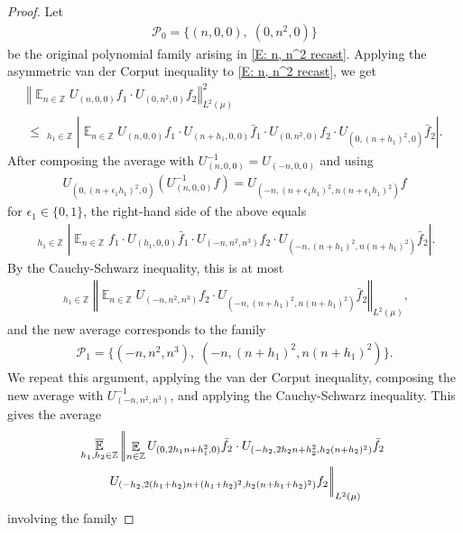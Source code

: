 \documentclass[11pt]{amsart}
\theoremstyle{definition}
\DeclareMathOperator*{\oE}{\overline{\mathbb{E}}}
\DeclareMathOperator*{\E}{\mathbb{E}}
\newcommand{\Z}{{\mathbb Z}}
\newcommand{\CP}{{\mathcal P}}
\newcommand{\eps}{\epsilon}
\newcommand{\norm}[1]{\left\Vert #1\right\Vert}
\newcommand{\inv}{^{-1}}
\newcommand{\1}{{\mathbf{1}}}
\newcommand{\abs}[1]{\mathopen{}\left| #1\mathclose{}\right|}
\begin{document}
\begin{proof}
Let
\begin{align*}
    \CP_0 = \{(n,0,0),\; (0, n^2,0)\}
\end{align*}
be the original polynomial family arising in \eqref{E: n, n^2 recast}. Applying the asymmetric van der Corput inequality to \eqref{E: n, n^2 recast}, we get
\begin{multline*}
    \norm{\E_{n\in\Z} U_{(n,0,0)}f_1\cdot U_{(0,n^2,0)}f_2}_{L^2(\mu)}^2\\
    \leq \oE_{h_1\in\Z}\abs{\E_{n\in \Z}U_{(n,0,0)}f_1\cdot U_{(n+h_1,0,0)}\bar f_1\cdot U_{(0,n^2,0)}f_2\cdot U_{(0,(n+h_1)^2,0)}\bar f_2}.
\end{multline*}
After composing the average with $U_{(n,0,0)}\inv = U_{(-n,0,0)}$ and using
\begin{align*}
    U_{(0,(n+\eps_1 h_1)^2,0)}(U_{(n,0,0)}\inv f) = U_{(-n, (n+\eps_1 h_1)^2, n(n+\eps_1 h_1)^2)}f
\end{align*}
for $\eps_1\in\{0,1\}$,
the right-hand side of the above equals
\begin{align*}
    \oE_{h_1\in\Z}\abs{\E_{n\in \Z}f_1\cdot U_{(h_1,0,0)}\bar f_1\cdot U_{(-n,n^2,n^3)}f_2\cdot U_{(-n,(n+h_1)^2,n(n+h_1)^2)}\bar f_2}.
\end{align*}
By the Cauchy-Schwarz inequality, this is at most
\begin{align*}
    \oE_{h_1\in\Z}\norm{\E_{n\in \Z} U_{(-n,n^2,n^3)}f_2\cdot U_{(-n,(n+h_1)^2,n(n+h_1)^2)}\bar f_2}_{L^2(\mu)},
\end{align*}
and the new average corresponds to the family
\begin{align*}
        \CP_1 = \{(-n, n^2, n^3),\; (-n, (n+h_1)^2, n(n+h_1)^2)\}.
    \end{align*}
    We repeat this argument, applying the van der Corput inequality, composing the new average with $U_{(-n,n^2,n^3)}\inv$, and applying the Cauchy-Schwarz inequality. This gives the average
    \begin{multline}\label{E: average over h_1, h_2 0}
        \oE_{h_1,h_2\in\Z}\left|\!\left|\E_{n\in\Z}U_{(0, 2h_1 n +h_1^2,0)}\bar f_2\cdot U_{(-h_2,2h_2 n +h_2^2,h_2(n+h_2)^2)}\bar f_2\right.\right.\\
    \left.\left. U_{(-h_2, 2(h_1+h_2) n +(h_1+h_2)^2, h_2(n+h_1+h_2)^2)}f_2\vphantom{\E_{n\in[N]}}\right|\!\right|_{L^2(\mu)}
    \end{multline}
    involving the family

\end{proof}
\end{document}
